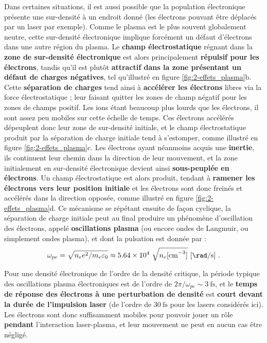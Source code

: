 \begin{refsection}
Dans certaines situations, il est aussi possible que la population électronique présente une sur-densité à un endroit donné (les électrons pouvant être déplacés par un laser par exemple). Comme le plasma est le plus souvent globalement neutre, cette sur-densité électronique implique forcément un défaut d'électrons dans une autre région du plasma. Le \textbf{champ électrostatique} régnant dans la \textbf{zone de sur-densité électronique} est alors principalement \textbf{répulsif pour les électrons}, tandis qu'il est plutôt \textbf{attractif dans la zone présentant un défaut de charges négatives}, tel qu'illustré en figure \ref{fig:2-effets_plasma}b. Cette \textbf{séparation de charges} tend ainsi à \textbf{accélérer les électrons} libres via la force électrostatique ; leur faisant quitter les zones de champ négatif pour les zones de champs positif. Les ions étant beaucoup plus lourds que les électrons, il sont assez peu mobiles sur cette échelle de temps. Ces électrons accélérés dépeuplent donc leur zone de sur-densité initiale, et le champ électrostatique produit par la séparation de charge initiale tend à s'estomper, comme illustré en figure \ref{fig:2-effets_plasma}c. Les électrons ayant néanmoins acquis une \textbf{inertie}, ils continuent leur chemin dans la direction de leur mouvement, et la zone initialement en sur-densité électronique devient ainsi \textbf{sous-peuplée en électrons}. Un champ électrostatique est alors produit, tendant à \textbf{ramener les électrons vers leur position initiale} et les électrons sont donc freinés et accélérés dans la direction opposée, comme illustré en figure \ref{fig:2-effets_plasma}d. 
Ce mécanisme se répétant ensuite de façon cyclique, la séparation de charge initiale peut au final produire un phénomène d'oscillation des électrons, appelé \textbf{oscillations plasma} (ou encore ondes de Langmuir, ou simplement ondes plasma), et dont la pulsation est donnée par \parencite{rax_2007, nrl} :
\begin{equation}
    \omega_{pe}=\sqrt{n_e e^2/m_e \varepsilon_0} \approx 5.64 \times 10^4 ~ \sqrt{n_e \si{[\cm^{-3}]}} ~ \si{[\rad\per\s]} ~ \rm .
\end{equation}

Pour une densité électronique de l'ordre de la densité critique, la période typique des oscillations plasma électroniques est de l'ordre de $2 \pi/ \omega_{pe} \sim 3 ~ \si{\fs}$, et le \textbf{temps de réponse des électrons à une perturbation de densité} est \textbf{court devant la durée de l'impulsion laser} (de l'ordre de $30 ~ \si{\fs}$ pour les lasers considérés ici). Les électrons sont donc suffisamment mobiles pour pouvoir jouer un rôle \textbf{pendant} l'interaction laser-plasma, et leur mouvement ne peut en aucun cas être négligé.


\end{refsection}
